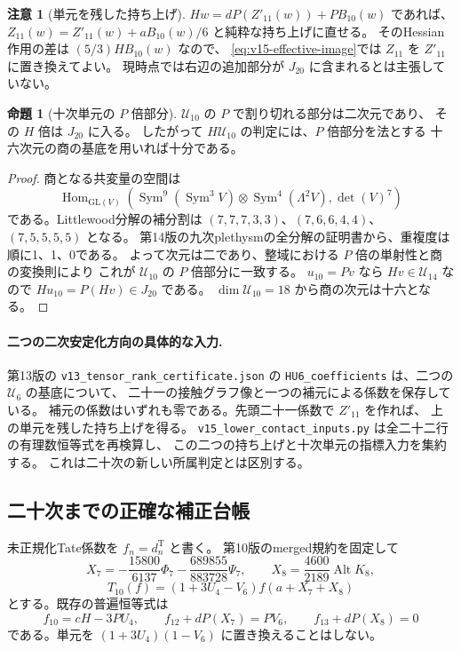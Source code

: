 \documentclass[a4paper,11pt]{ltjsarticle}
\theoremstyle{definition}
\newtheorem{remark}[theorem]{注意}
\newtheorem{proposition}[theorem]{命題}
\begin{document}
\begin{remark}[単元を残した持ち上げ]
$Hw=dP(Z'_{11}(w))+PB_{10}(w)$ であれば、
$Z_{11}(w)=Z'_{11}(w)+aB_{10}(w)/6$ と純粋な持ち上げに直せる。
そのHessian作用の差は $(5/3)HB_{10}(w)$ なので、
\eqref{eq:v15-effective-image}では $Z_{11}$ を $Z'_{11}$ に置き換えてよい。
現時点では右辺の追加部分が $J_{20}$ に含まれるとは主張していない。
\end{remark}

\begin{proposition}[十次単元の $P$ 倍部分]
\label{prop:v15-pdivisible-tenth-unit}
$\mathcal U_{10}$ の $P$ で割り切れる部分は二次元であり、
その $H$ 倍は $J_{20}$ に入る。
したがって $H\mathcal U_{10}$ の判定には、$P$ 倍部分を法とする
十六次元の商の基底を用いれば十分である。
\end{proposition}

\begin{proof}
商となる共変量の空間は
\[
 \operatorname{Hom}_{\mathrm{GL}(V)}\left(
 \operatorname{Sym}^{9}(\operatorname{Sym}^3V)
 \otimes\operatorname{Sym}^{4}(\Lambda^2V),\det(V)^7\right)
\]
である。Littlewood分解の補分割は
$(7,7,7,3,3)$、$(7,6,6,4,4)$、$(7,5,5,5,5)$ となる。
第14版の九次plethysmの全分解の証明書から、重複度は順に1、1、0である。
よって次元は二であり、整域における $P$ 倍の単射性と商の変換則により
これが $\mathcal U_{10}$ の $P$ 倍部分に一致する。
$u_{10}=Pv$ なら $Hv\in\mathcal U_{14}$ なので
$Hu_{10}=P(Hv)\in J_{20}$ である。
$\dim\mathcal U_{10}=18$ から商の次元は十六となる。
\end{proof}

\paragraph{二つの二次安定化方向の具体的な入力.}
第13版の \texttt{v13\_tensor\_rank\_certificate.json} の
\texttt{HU6\_coefficients} は、二つの $\mathcal U_6$ の基底について、
二十一の接触グラフ像と一つの補元による係数を保存している。
補元の係数はいずれも零である。先頭二十一係数で $Z'_{11}$ を作れば、
上の単元を残した持ち上げを得る。
\nolinkurl{v15_lower_contact_inputs.py} は全二十二行の有理数恒等式を再検算し、
この二つの持ち上げと十次単元の指標入力を集約する。
これは二十次の新しい所属判定とは区別する。

\subsection{二十次までの正確な補正台帳}

未正規化Tate係数を $f_n=d_n^{\mathrm T}$ と書く。
第10版のmerged規約を固定して
\[
 X_7=-\frac{15800}{6137}\Phi_7-\frac{689855}{883728}\Psi_7,
 \qquad X_8=\frac{4600}{2189}\operatorname{Alt}K_8,
\]
\[
 T_{10}(f)=(1+3U_4-V_6)f(a+X_7+X_8)
\]
とする。既存の普遍恒等式は
\[
 f_{10}=cH-3PU_4,\qquad
 f_{12}+dP(X_7)=PV_6,\qquad f_{13}+dP(X_8)=0
\]
である。単元を $(1+3U_4)(1-V_6)$ に置き換えることはしない。
\end{document}
